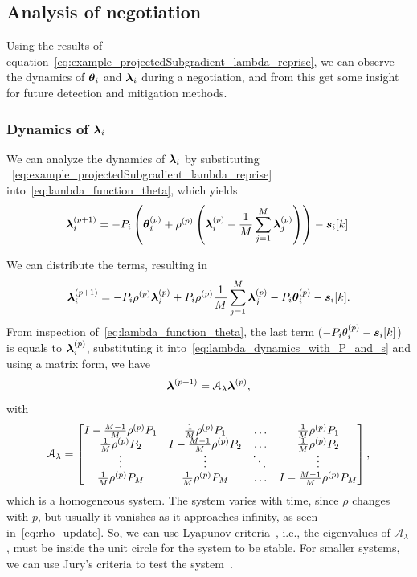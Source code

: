 \documentclass[../main.tex]{subfiles}
\begin{document}
\subsection{Analysis of negotiation}\label{sec:analysis-negotiation}
Using the results of equation~\eqref{eq:example_projectedSubgradient_lambda_reprise}, we can observe the dynamics of $\boldsymbol{\theta}_{i}$ and $\boldsymbol{\lambda}_{i}$ during a negotiation, and from this get some insight for future detection and mitigation methods.

\subsubsection{Dynamics of $\boldsymbol{\lambda}_{i}$}
We can analyze the dynamics of $\boldsymbol{\lambda}_{i}$ by substituting
~\eqref{eq:example_projectedSubgradient_lambda_reprise} into~\eqref{eq:lambda_function_theta}, which yields
\begin{equation}
  \label{eq:lambda_dynamics}
\boldsymbol{\lambda}_{i}^{(p+1)}=-{P}_{i}\left(\boldsymbol{\theta}_{i}^{(p)}+\rho^{(p)}\left(\boldsymbol{\lambda}_{i}^{(p)}-\frac{1}{M}\sum_{j=1}^{M}\boldsymbol{\lambda}_j^{(p)}\right)\right)-\boldsymbol{s}_{i}[k].
\end{equation}

We can distribute the terms, resulting in
\begin{equation}
  \label{eq:lambda_dynamics_with_P_and_s}
\boldsymbol{\lambda}_{i}^{(p+1)}=-{P}_{i}\rho^{(p)}\boldsymbol{\lambda}_{i}^{(p)}+{P}_{i}\rho^{(p)}\frac{1}{M}\sum_{j=1}^{M}\boldsymbol{\lambda}_j^{(p)}-{P}_{i}\boldsymbol{\theta}_{i}^{(p)}-\boldsymbol{s}_{i}[k].
\end{equation}
From inspection of~\eqref{eq:lambda_function_theta}, the last term ($-{P}_{i}\theta_{i}^{(p)}-\boldsymbol{s}_{i}[k]$) is equals to $\boldsymbol{\lambda}_{i}^{(p)}$, substituting it into~\eqref{eq:lambda_dynamics_with_P_and_s} and using a matrix form, we have
\begin{equation}
  \label{eq:negotiation_equation_substituting_organizing_matrix_lambda}
  \boldsymbol{\lambda}^{(p+1)}=\mathcal{A}_{\lambda}\boldsymbol{\lambda}^{(p)},
\end{equation}
with
\begin{equation}
\mathcal{A}_{\lambda}=\left[
\begin{matrix}
I-\frac{M-1}{M}\rho\p \Plin[1] & \frac{1}{M}\rho\p \Plin[1]&\dots&\frac{1}{M}\rho\p \Plin[1]\\
\frac{1}{M}\rho\p \Plin[2]&I-\frac{M-1}{M}\rho\p \Plin[2]&\dots&\frac{1}{M}\rho\p \Plin[2]\\
\vdots&\vdots&\ddots&\vdots\\
\frac{1}{M}\rho\p \Plin[M]&\frac{1}{M}\rho\p \Plin[M]&\dots&I-\frac{M-1}{M}\rho\p \Plin[M]\\
\end{matrix}
\right],
\end{equation}
which is a \dt{} homogeneous system.
The system varies with time, since $\rho$ changes with $p$, but usually it vanishes as it approaches infinity, as seen in~\eqref{eq:rho_update}.
So, we can use Lyapunov criteria~\cite[\S8.6]{Hespanha2009}, i.e., the eigenvalues of $\mathcal{A}_{\lambda}$, must be inside the unit circle for the system to be stable.
For smaller systems, we can use Jury's criteria to test the system~\cite{Jury1962}.
\end{document}
